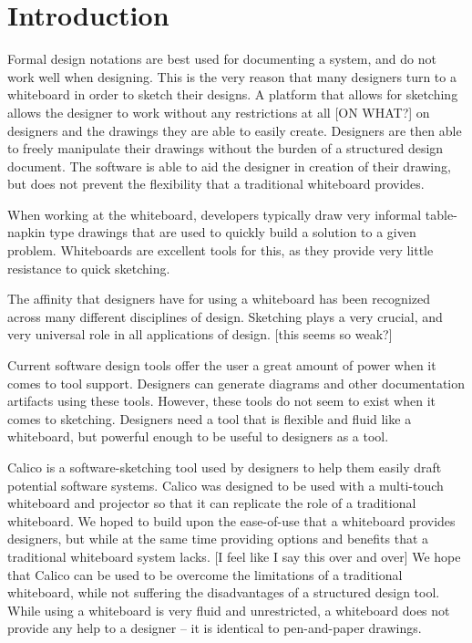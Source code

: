\chapter{Introduction}

Formal design notations are best used for documenting a system, and do not work well when designing. This is the very reason that many designers turn to a whiteboard in order to sketch their designs. A platform that allows for sketching allows the designer to work without any restrictions at all [ON WHAT?] on designers and the drawings they are able to easily create. Designers are then able to freely manipulate their drawings without the burden of a structured design document. The software is able to aid the designer in creation of their drawing, but does not prevent the flexibility that a traditional whiteboard provides.  

When working at the whiteboard, developers typically draw very informal table-napkin type drawings that are used to quickly build a solution to a given problem. Whiteboards are excellent tools for this, as they provide very little resistance to quick sketching. 

The affinity that designers have for using a whiteboard has been recognized across many different disciplines of design. Sketching plays a very crucial, and very universal role in all applications of design. [this seems so weak?]

Current software design tools offer the user a great amount of power when it comes to tool support. Designers can generate diagrams and other documentation artifacts using these tools. However, these tools do not seem to exist when it comes to sketching. Designers need a tool that is flexible and fluid like a whiteboard, but powerful enough to be useful to designers as a tool.  

Calico is a software-sketching tool used by designers to help them easily draft potential software systems. Calico was designed to be used with a multi-touch whiteboard and projector so that it can replicate the role of a traditional whiteboard. We hoped to build upon the ease-of-use that a whiteboard provides designers, but while at the same time providing options and benefits that a traditional whiteboard system lacks. [I feel like I say this over and over] We hope that Calico can be used to be overcome the limitations of a traditional whiteboard, while not suffering the disadvantages of a structured design tool. While using a whiteboard is very fluid and unrestricted, a whiteboard does not provide any help to a designer -- it is identical to pen-and-paper drawings. 

